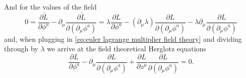 \documentclass[../main.tex]{subfiles}
\begin{document}
And for the values of the field
\begin{equation*}
	0 = \frac{\partial \tilde{L}}{\partial \phi^a} - \partial_\mu \frac{\partial
	\tilde{L}}{\partial(\partial_\mu \phi^a)} = \lambda \frac{\partial L}{\partial \phi^a} -
	(\partial_\mu \lambda) \frac{\partial L}{\partial (\partial_\mu \phi^a) } - \lambda
	\partial_\mu \frac{\partial L}{\partial (\partial_\mu \phi^a) }
\end{equation*}
and, when plugging in \cref{eq:euler lagrange multiplier field theory} and dividing
through by \( \lambda \) we arrive at the field theoretical Herglotz equations
\begin{equation} \label{eq:herglotz field theory}
	\frac{\partial L}{\partial \phi^a} - \partial_\mu \frac{\partial
	L}{\partial(\partial_\mu \phi^a)} + \frac{\partial L}{\partial z^\mu} \frac{\partial
L}{\partial(\partial_\mu \phi^a)} = 0. 
\end{equation}
\end{document}

